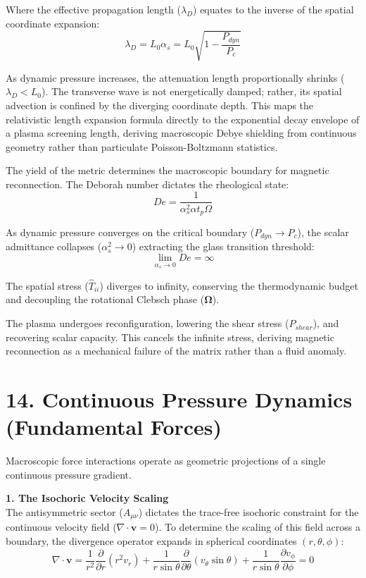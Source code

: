 Where the effective propagation length ($\lambda_D$) equates to the inverse of the spatial coordinate expansion: 
\begin{equation}
    \lambda_D = L_0 \alpha_s = L_0 \sqrt{1 - \frac{P_{dyn}}{P_c}}
\end{equation}

As dynamic pressure increases, the attenuation length proportionally shrinks ($\lambda_D < L_0$). The transverse wave is not energetically damped; rather, its spatial advection is confined by the diverging coordinate depth. This maps the relativistic length expansion formula directly to the exponential decay envelope of a plasma screening length, deriving macroscopic Debye shielding from continuous geometry rather than particulate Poisson-Boltzmann statistics. 

The yield of the metric determines the macroscopic boundary for magnetic reconnection. The Deborah number dictates the rheological state: 
\begin{equation}
    De = \frac{1}{\alpha_s^2 \alpha t_p \Omega}
\end{equation}

As dynamic pressure converges on the critical boundary ($P_{dyn} \to P_c$), the scalar admittance collapses ($\alpha_s^2 \to 0$) extracting the glass transition threshold:
\begin{equation}
    \lim_{\alpha_s \to 0} De = \infty
\end{equation}

The spatial stress ($\hat{T}_{ii}$) diverges to infinity, conserving the thermodynamic budget and decoupling the rotational Clebsch phase ($\boldsymbol{\Omega}$). 

The plasma undergoes reconfiguration, lowering the shear stress ($P_{shear}$), and recovering scalar capacity. This cancels the infinite stress, deriving magnetic reconnection as a mechanical failure of the matrix rather than a fluid anomaly.


\section*{14. Continuous Pressure Dynamics (Fundamental Forces)}

Macroscopic force interactions operate as geometric projections of a single continuous pressure gradient. 

\textbf{1. The Isochoric Velocity Scaling} \\
The antisymmetric sector ($A_{\mu\nu}$) dictates the trace-free isochoric constraint for the continuous velocity field ($\nabla \cdot \mathbf{v} = 0$). To determine the scaling of this field across a boundary, the divergence operator expands in spherical coordinates $(r, \theta, \phi)$:
\begin{equation}
    \nabla \cdot \mathbf{v} = \frac{1}{r^2} \frac{\partial}{\partial r}(r^2 v_r) + \frac{1}{r \sin\theta} \frac{\partial}{\partial \theta}(v_\theta \sin\theta) + \frac{1}{r \sin\theta} \frac{\partial v_\phi}{\partial \phi} = 0
\end{equation}

